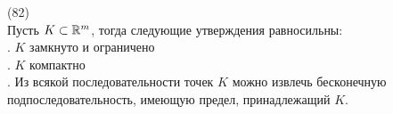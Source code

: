 (82)\\
Пусть $K \subset \mathbb{R}^m$, тогда следующие утверждения равносильны:\\
. $K$ замкнуто и ограничено\\
. $K$ компактно\\
. Из всякой последовательности точек $K$ можно извлечь бесконечную подпоследовательность, имеющую предел, принадлежащий $K$.